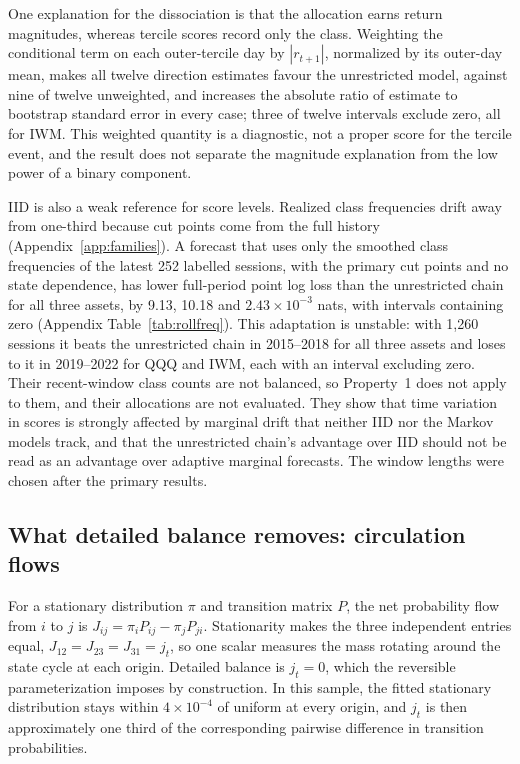 One explanation for the dissociation is that the allocation earns return magnitudes, whereas tercile scores record only the class. Weighting the conditional term on each outer-tercile day by $|r_{t+1}|$, normalized by its outer-day mean, makes all twelve direction estimates favour the unrestricted model, against nine of twelve unweighted, and increases the absolute ratio of estimate to bootstrap standard error in every case; three of twelve intervals exclude zero, all for IWM. This weighted quantity is a diagnostic, not a proper score for the tercile event, and the result does not separate the magnitude explanation from the low power of a binary component.

IID is also a weak reference for score levels. Realized class frequencies drift away from one-third because cut points come from the full history (Appendix~\ref{app:families}). A forecast that uses only the smoothed class frequencies of the latest 252 labelled sessions, with the primary cut points and no state dependence, has lower full-period point log loss than the unrestricted chain for all three assets, by 9.13, 10.18 and $2.43\times10^{-3}$ nats, with intervals containing zero (Appendix Table~\ref{tab:rollfreq}). This adaptation is unstable: with 1,260 sessions it beats the unrestricted chain in 2015--2018 for all three assets and loses to it in 2019--2022 for QQQ and IWM, each with an interval excluding zero. Their recent-window class counts are not balanced, so Property~1 does not apply to them, and their allocations are not evaluated. They show that time variation in scores is strongly affected by marginal drift that neither IID nor the Markov models track, and that the unrestricted chain's advantage over IID should not be read as an advantage over adaptive marginal forecasts. The window lengths were chosen after the primary results.

\subsection{What detailed balance removes: circulation flows}\label{sec:circulation}
For a stationary distribution $\pi$ and transition matrix $P$, the net probability flow from $i$ to $j$ is $J_{ij}=\pi_iP_{ij}-\pi_jP_{ji}$. Stationarity makes the three independent entries equal, $J_{12}=J_{23}=J_{31}=j_t$, so one scalar measures the mass rotating around the state cycle at each origin. Detailed balance is $j_t=0$, which the reversible parameterization imposes by construction. In this sample, the fitted stationary distribution stays within $4\times10^{-4}$ of uniform at every origin, and $j_t$ is then approximately one third of the corresponding pairwise difference in transition probabilities.


